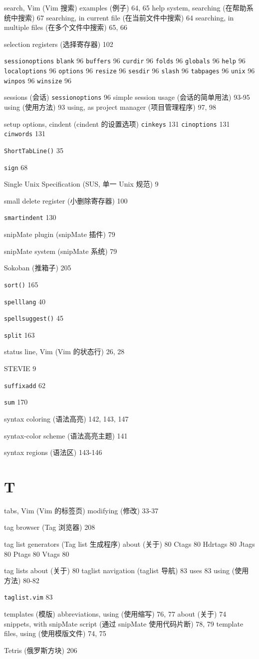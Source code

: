 search, Vim (Vim 搜索)
  examples (例子) 64, 65
  help system, searching (在帮助系统中搜索) 67
  searching, in current file (在当前文件中搜索) 64
  searching, in multiple files (在多个文件中搜索) 65, 66

selection registers (选择寄存器) 102

\texttt{sessionoptions}
  \texttt{blank} 96
  \texttt{buffers} 96
  \texttt{curdir} 96
  \texttt{folds} 96
  \texttt{globals} 96
  \texttt{help} 96
  \texttt{localoptions} 96
  \texttt{options} 96
  \texttt{resize} 96
  \texttt{sesdir} 96
  \texttt{slash} 96
  \texttt{tabpages} 96
  \texttt{unix} 96
  \texttt{winpos} 96
  \texttt{winsize} 96

sessions (会话)
  \texttt{sessionoptions} 96
  simple session usage (会话的简单用法) 93-95
  using (使用方法) 93
  using, as project manager (项目管理程序) 97, 98

setup options, cindent (cindent 的设置选项)
  \texttt{cinkeys} 131
  \texttt{cinoptions} 131
  \texttt{cinwords} 131

\texttt{ShortTabLine()} 35

\texttt{sign} 68

Single Unix Specification (SUS, 单一 Unix 规范) 9

small delete register (小删除寄存器) 100

\texttt{smartindent} 130

snipMate plugin (snipMate 插件) 79

snipMate system (snipMate 系统) 79

Sokoban (推箱子) 205

\texttt{sort()} 165

\texttt{spelllang} 40

\texttt{spellsuggest()} 45

\texttt{split} 163

status line, Vim (Vim 的状态行) 26, 28

STEVIE 9

\texttt{suffixadd} 62

\texttt{sum} 170

syntax coloring (语法高亮) 142, 143, 147

syntax-color scheme (语法高亮主题) 141

syntax regions (语法区) 143-146

\section{T}

tabs, Vim (Vim 的标签页)
  modifying (修改) 33-37

tag browser (Tag 浏览器) 208

tag list generators (Tag list 生成程序)
  about (关于) 80
  Ctags 80
  Hdrtags 80
  Jtags 80
  Ptags 80
  Vtags 80

tag lists
  about (关于) 80
  taglist navigation (taglist 导航) 83
  uses 83
  using (使用方法) 80-82

\texttt{taglist.vim} 83

templates (模版)
  abbreviations, using (使用缩写) 76, 77
  about (关于) 74
  snippets, with snipMate script (通过 snipMate 使用代码片断) 78, 79
  template files, using (使用模版文件) 74, 75

Tetris (俄罗斯方块) 206
